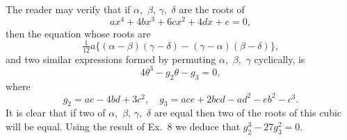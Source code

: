 The reader may verify that if $\alpha$,~$\beta$, $\gamma$,~$\delta$ are the roots of
\[
ax^{4} + 4bx^{3} + 6cx^{2} + 4dx + e = 0,
\]
then the equation whose roots are
\[
\tfrac{1}{12}a \{
  (\alpha - \beta)(\gamma - \delta) - (\gamma - \alpha)(\beta - \delta)
\},
\]
and two similar expressions formed by permuting $\alpha$,~$\beta$,~$\gamma$ cyclically, is
\[
4\theta^{3} - g_{2}\theta - g_{3} = 0,
\]
where
\[
g_{2} = ae - 4bd + 3c^{2},\quad
g_{3} = ace + 2bcd - ad^{2} - eb^{2} - c^{3}.
\]
It is clear that if two of $\alpha$,~$\beta$, $\gamma$,~$\delta$ are equal then two of the roots of this cubic
will be equal. Using the result of Ex.~8 we deduce that $g_{2}^{3} - 27g_{3}^{2} = 0$.

